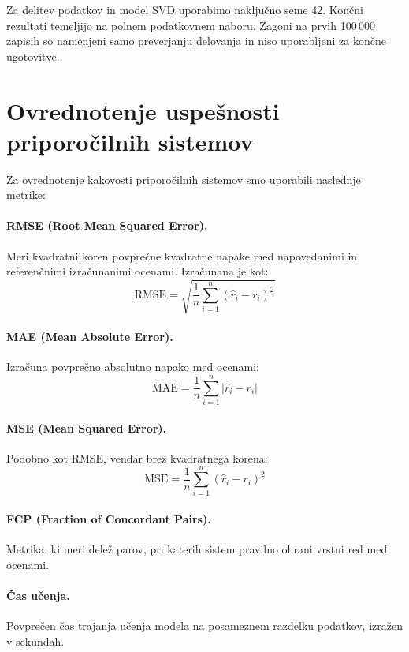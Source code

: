 \documentclass[a4paper,twoside,openright,12pt,slovene]{book}
\begin{document}
Za delitev podatkov in model SVD uporabimo naključno seme 42.
Končni rezultati temeljijo na polnem podatkovnem naboru.
Zagoni na prvih 100\,000 zapisih so namenjeni samo preverjanju
delovanja in niso uporabljeni za končne ugotovitve.


\section{Ovrednotenje uspešnosti priporočilnih sistemov} \label{sec:evaluation_metrics}
Za ovrednotenje kakovosti priporočilnih sistemov smo uporabili naslednje metrike:

\paragraph{RMSE (Root Mean Squared Error).} Meri kvadratni koren povprečne kvadratne napake med napovedanimi
in referenčnimi izračunanimi ocenami. Izračunana je kot:
\begin{equation}
\text{RMSE} = \sqrt{\frac{1}{n} \sum_{i=1}^n (\hat{r}_i - r_i)^2}
\label{eq:rmse}
\end{equation}

\paragraph{MAE (Mean Absolute Error).} Izračuna povprečno absolutno napako med ocenami:
\begin{equation}
\text{MAE} = \frac{1}{n} \sum_{i=1}^n |\hat{r}_i - r_i|
\label{eq:mae}
\end{equation}

\paragraph{MSE (Mean Squared Error).} Podobno kot RMSE, vendar brez kvadratnega korena:
\begin{equation}
\text{MSE} = \frac{1}{n} \sum_{i=1}^n (\hat{r}_i - r_i)^2
\label{eq:mse}
\end{equation}

\paragraph{FCP (Fraction of Concordant Pairs).} Metrika, ki meri delež parov, pri katerih sistem pravilno ohrani vrstni red med ocenami.

\paragraph{Čas učenja.} Povprečen čas trajanja učenja modela na posameznem razdelku podatkov, izražen v sekundah.
\end{document}
